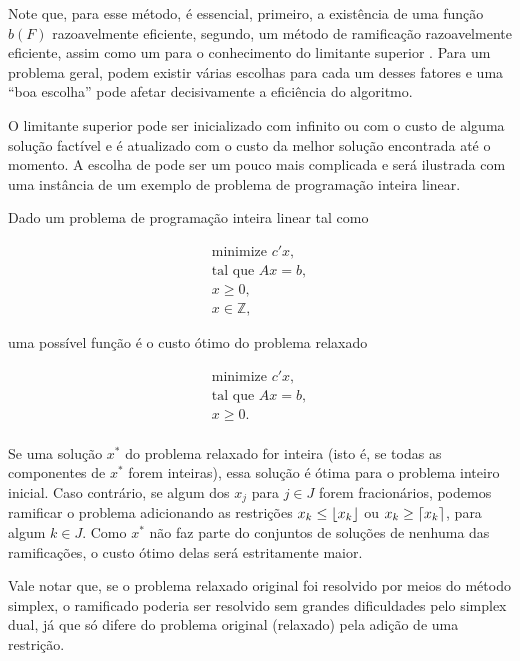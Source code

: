 Note que, para esse método, é essencial, primeiro, a existência de uma
função $b(F)$ razoavelmente eficiente, segundo, um método de
ramificação razoavelmente eficiente, assim como um para o conhecimento
do limitante superior . Para um problema geral, podem
existir várias escolhas para cada um desses fatores e uma ``boa
escolha'' pode afetar decisivamente a eficiência do algoritmo.

O limitante superior  pode ser inicializado com infinito
ou com o custo de alguma solução factível e é atualizado com o custo
da melhor solução encontrada até o momento. A escolha de 
pode ser um pouco mais complicada e será ilustrada com uma instância
de um exemplo de problema de programação inteira linear.

Dado um problema de programação inteira linear tal como

\begin{equation}
  \begin{split}
    \text{minimize } c'x, \\ \text{tal que } Ax = b,\\ x \geq 0,\\ x
    \in \mathbb{Z},
  \end{split}\label{eq:inteiro}
\end{equation}

\noindent uma possível função  é o custo ótimo do problema
relaxado

\begin{equation}
  \begin{split}
    \text{minimize } c'x, \\ \text{tal que } Ax = b,\\ x \geq 0.\\
  \end{split}\label{eq:inteiro}
\end{equation}

Se uma solução $x^*$ do problema relaxado for inteira (isto é, se
todas as componentes de $x^*$ forem inteiras), essa solução é ótima
para o problema inteiro inicial. Caso contrário, se algum dos $x_j$
para $j \in J$ forem fracionários, podemos ramificar o problema
adicionando as restrições $x_k \leq \floor*{x_k}$ ou $x_k \geq
\ceil*{x_k}$, para algum $k \in J$. Como $x^*$ não faz parte do
conjuntos de soluções de nenhuma das ramificações, o custo ótimo delas
será estritamente maior.

Vale notar que, se o problema relaxado original foi resolvido por
meios do método simplex, o ramificado poderia ser resolvido sem
grandes dificuldades pelo simplex dual, já que só difere do problema
original (relaxado) pela adição de uma restrição.

